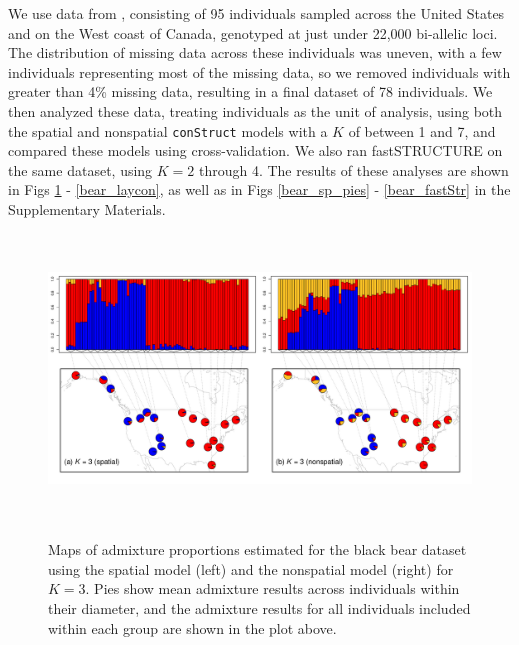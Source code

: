 \documentclass[12pt]{article}
\begin{document}
We use data from \cite{Puckett2015}, consisting of 95 individuals 
sampled across the United States and on the West coast of Canada,
genotyped at just under 22,000 bi-allelic loci.
The distribution of missing data across these individuals was uneven, 
with a few individuals representing most of the missing data, 
so we removed individuals with greater than 4\% missing data, 
resulting in a final dataset of 78 individuals.
We then analyzed these data, treating individuals as the unit of analysis, 
using both the spatial and nonspatial \texttt{conStruct} models with a $K$ of between 1 and 7, 
and compared these models using cross-validation.
We also ran fastSTRUCTURE \citep{fastStructure} on the same dataset, 
using $K = 2$ through 4.
The results of these analyses are shown in Figs \ref{bear_K3} - \ref{bear_laycon}, 
as well as in Figs \ref{bear_sp_pies} - \ref{bear_fastStr} in the Supplementary Materials.

\begin{figure}
	\centering
		{\includegraphics[width=6in,height=3in]{figs/bears/bears_sp_vs_nsp.pdf}}
	\caption{
	Maps of admixture proportions estimated for the black bear dataset 
	using the spatial model (left) and the nonspatial model (right) for $K=3$.
	Pies show mean admixture results across individuals within their diameter, 
	and the admixture results for all individuals included within each group are 
	shown in the plot above.
    }\label{bear_K3}
\end{figure}
\end{document}
